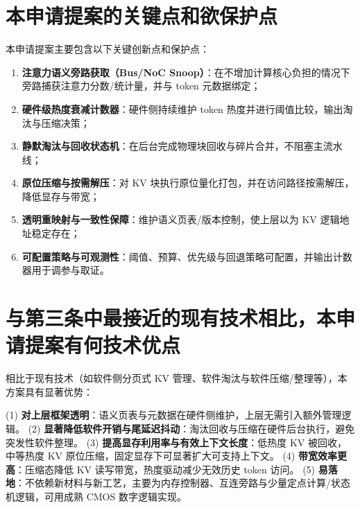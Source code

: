 \documentclass[12pt,a4paper]{article}
\begin{document}
\section{本申请提案的关键点和欲保护点}

本申请提案主要包含以下关键创新点和保护点：

\begin{enumerate}
    \item \textbf{注意力语义旁路获取（Bus/NoC Snoop）}：在不增加计算核心负担的情况下旁路捕获注意力分数/统计量，并与 token 元数据绑定；
    \item \textbf{硬件级热度衰减计数器}：硬件侧持续维护 token 热度并进行阈值比较，输出淘汰与压缩决策；
    \item \textbf{静默淘汰与回收状态机}：在后台完成物理块回收与碎片合并，不阻塞主流水线；
    \item \textbf{原位压缩与按需解压}：对 KV 块执行原位量化打包，并在访问路径按需解压，降低显存与带宽；
    \item \textbf{透明重映射与一致性保障}：维护语义页表/版本控制，使上层以为 KV 逻辑地址稳定存在；
    \item \textbf{可配置策略与可观测性}：阈值、预算、优先级与回退策略可配置，并输出计数器用于调参与取证。
\end{enumerate}

\section{与第三条中最接近的现有技术相比，本申请提案有何技术优点}

相比于现有技术（如软件侧分页式 KV 管理、软件淘汰与软件压缩/整理等），本方案具有显著优势：

(1) \textbf{对上层框架透明}：语义页表与元数据在硬件侧维护，上层无需引入额外管理逻辑。
(2) \textbf{显著降低软件开销与尾延迟抖动}：淘汰回收与压缩在硬件后台执行，避免突发性软件整理。
(3) \textbf{提高显存利用率与有效上下文长度}：低热度 KV 被回收，中等热度 KV 原位压缩，固定显存下可显著扩大可支持上下文。
(4) \textbf{带宽效率更高}：压缩态降低 KV 读写带宽，热度驱动减少无效历史 token 访问。
(5) \textbf{易落地}：不依赖新材料与新工艺，主要为内存控制器、互连旁路与少量定点计算/状态机逻辑，可用成熟 CMOS 数字逻辑实现。
\end{document}
